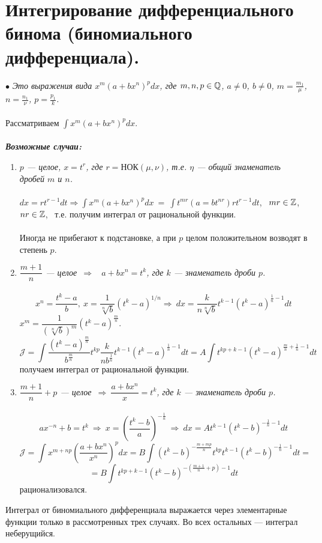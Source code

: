 \section{Интегрирование дифференциального бинома (биномиального дифференциала).}
$\bullet$ \textit{Это выражения вида $x^m(a+bx^n)^p d x$, где $m, n, p \in \mathbb{Q}$, $a \neq 0$, $b \neq 0$, $m = \frac{m_1}{\mu}$, $n = \frac{ n_1}{\nu}$, $p= \frac{p_1}{k}$.}\\\\
Рассматриваем $\int x^m(a+bx^n)^p d x$.\\\\
\textit{\textbf{Возможные случаи:}}
\begin{enumerate}
	\item \textit{ $p$ --- целое,  $x=t^r$, где $r =  \text{НОК} (\mu,\nu)$, т.е. $\eta$ --- общий знаменатель дробей $m$ и $n$.}\\\\
	$dx=rt^{r-1}dt \Rightarrow \int x^m(a+bx^n)^p d x \ =\ \int t^{mr }(a=bt^{nr})r t^{r - 1} d t$, \ $mr \in \mathbb{Z}$, $nr \in \mathbb{Z}$, \ т.е. получим интеграл от рациональной функции.\\\\
	Иногда не прибегают к подстановке, а при $p$ целом положительном возводят в степень $p$.
	\item \textit{ $\dfrac{m+1}{n}$ --- целое\ $\Rightarrow$ \ $a+bx^n = t^k$, где $k$ --- знаменатель дроби $p$. }\\\\
	$$x^n=\frac{t^k-a}{b},\ x=\frac{1}{\sqrt[n]{b}}(t^k-a)^{1/n} \Rightarrow \ dx = \frac{k}{n\sqrt[n]{b}} t^{k-1} (t^k-a)^{\frac{1}{n}-1} dt$$
	$x^m =\dfrac{1}{(\sqrt[n]{b})^m}(t^k-a)^{\frac{m}{n}}$.
	$$\mathcal{J}= \int \frac{(t^k-a)^{\frac{m}{n}}}{b^{\frac{m}{n}}} t^{kp} \frac{k}{nb^{\frac{1}{n}}} t^{k-1} (t^k-a)^{\frac{1}{n} -1} dt = A \int t^{kp+k-1} (t^k-a)^{\frac{m}{n}+\frac{1}{n} -1} dt$$ получаем интеграл от рациональной функции.
	\item \textit{ $\dfrac{m+1}{n}+p$ --- целое\ $\Rightarrow \  \dfrac{a+bx^n}{x}  = t^k$, где $k$ --- знаменатель дроби $p$. }\\\\
	$$ax^{-n}+b = t^k \ \Rightarrow \ x = (\frac{t^k-b}{a})^{-\frac{1}{n}}\ \Rightarrow \ dx = A t^{k-1}(t^k-b)^{-\frac{1}{n}-1}dt $$
	$$\mathcal{J}= \int x^{m + np} (\frac{a+bx^n}{x^n})^p dx = B \int (t^k -b)^{-\frac{m+mp}{n}} t^{kp} t^{k-1} (t^k - b)^{-\frac{1}{n}-1} dt =$$ $$= B \int t^{kp+k-1} (t^k-b)^{-(\frac{m+1}{n}+p)-1} dt$$ рационализовался.
\end{enumerate}
\begin{theorem}[Чебышева]
	Интеграл от биномиального дифференциала выражается через элементарные функции только в рассмотренных трех случаях. Во всех  остальных --- интеграл неберущийся.
\end{theorem}

